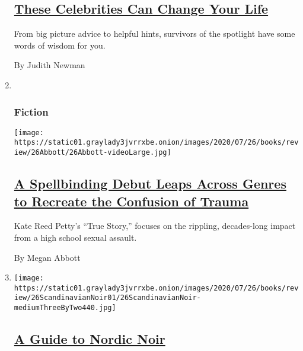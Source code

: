 \begin{enumerate}
  \hypertarget{these-celebrities-can-change-your-life}{%
  \subsection{\texorpdfstring{\href{/2020/07/28/books/review/hustle-harder-hustle-smarter-curtis-jackson.html}{These
  Celebrities Can Change Your
  Life}}{These Celebrities Can Change Your Life}}\label{these-celebrities-can-change-your-life}}

  From big picture advice to helpful hints, survivors of the spotlight
  have some words of wisdom for you.

  By Judith Newman
\item ~
  \hypertarget{fiction-2}{%
  \subsubsection{Fiction}\label{fiction-2}}

  \texttt{[image: https://static01.graylady3jvrrxbe.onion/images/2020/07/26/books/review/26Abbott/26Abbott-videoLarge.jpg]}

  \hypertarget{a-spellbinding-debut-leaps-across-genres-to-recreate-the-confusion-of-trauma}{%
  \subsection{\texorpdfstring{\href{/2020/07/24/books/review/kate-reed-petty-true-story.html}{A
  Spellbinding Debut Leaps Across Genres to Recreate the Confusion of
  Trauma}}{A Spellbinding Debut Leaps Across Genres to Recreate the Confusion of Trauma}}\label{a-spellbinding-debut-leaps-across-genres-to-recreate-the-confusion-of-trauma}}

  Kate Reed Petty's ``True Story,'' focuses on the rippling,
  decades-long impact from a high school sexual assault.

  By Megan Abbott
\item
  \texttt{[image: https://static01.graylady3jvrrxbe.onion/images/2020/07/26/books/review/26ScandinavianNoir01/26ScandinavianNoir-mediumThreeByTwo440.jpg]}

  \hypertarget{a-guide-to-nordic-noir}{%
  \subsection{\texorpdfstring{\href{/2020/07/24/books/review/nordic-noir-guide.html}{A
  Guide to Nordic
  Noir}}{A Guide to Nordic Noir}}\label{a-guide-to-nordic-noir}}


\end{enumerate}
